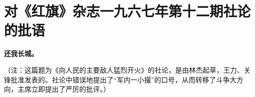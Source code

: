 \section[对《红旗》杂志一九六七年第十二期社论的批语（一九六七年八月）]{对《红旗》杂志一九六七年第十二期社论的批语}


\textbf{还我长城。}

（注：这篇题为《向人民的主要敌人猛烈开火》的社论，是由林杰起草，王力、关锋批准发表的。社论中错误地提出了“军内一小撮”的口号，从而转移了斗争大方向，主席立即提出了严厉的批评。）

